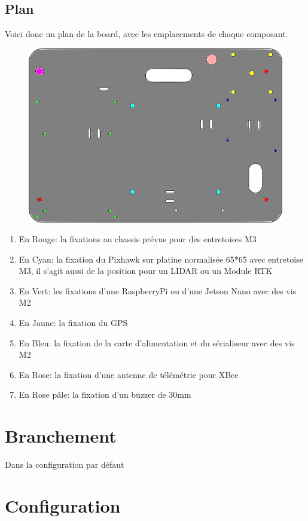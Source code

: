 \documentclass[a4paper, 10pt]{report}
\begin{document}
\section{Plan}

Voici donc un plan de la board, avec les emplacements de chaque composant.
\begin{figure}[!h]
\includegraphics[scale=0.5]{fig/plan.png}
\end{figure}
\begin{enumerate}
\item En Rouge: la fixations au chassis prévus pour des entretoises M3
\item En Cyan: la fixation du Pixhawk sur platine normalisée 65*65 avec entretoise M3, il s'agit aussi de la position pour un LIDAR ou un Module RTK
\item En Vert: les fixations d'une RaspberryPi ou d'une Jetson Nano avec des vis M2
\item En Jaune: la fixation du GPS
\item En Bleu: la fixation de la carte d'alimentation et du sérialiseur avec des vis M2
\item En Rose: la fixation d'une antenne de télémétrie pour XBee
\item En Rose pâle: la fixation d'un buzzer de 30mm
\end{enumerate}

\chapter{Branchement}
	Dans la configuration par défaut
\chapter{Configuration}
\end{document}
